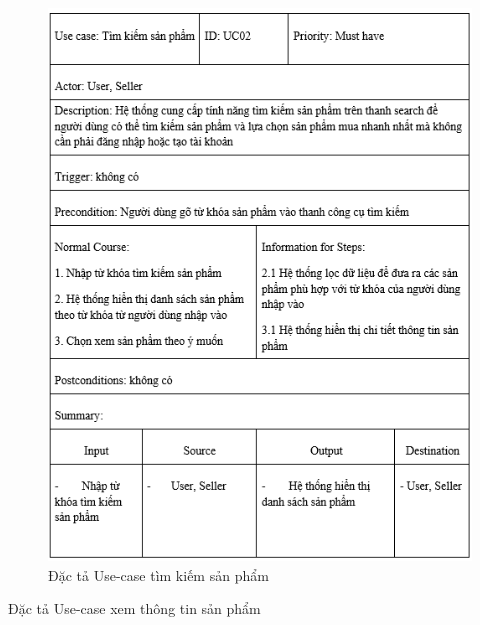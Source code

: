 \documentclass{article}
\begin{document}
{{	\begin{center}
		\begin{figure}[htp]
			\begin{center}
				\includegraphics[scale=.950]{anh11.png}
			\end{center}
			\caption{Đặc tả Use-case tìm kiếm sản phẩm}
			
		\end{figure}
	\end{center}
\newpage
{\large Đặc tả Use-case xem thông tin sản phẩm
	
}}}
\end{document}
